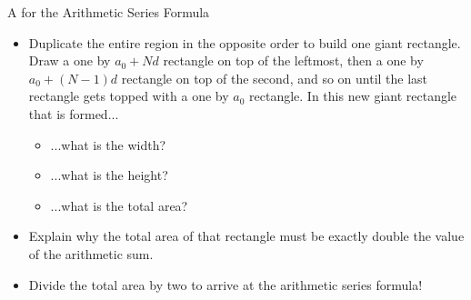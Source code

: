 \begin{exercise}{A  for the Arithmetic Series Formula \Coffeecup \Coffeecup \Coffeecup}
\begin{itemize}
\item Duplicate the entire region in the opposite order to build one giant rectangle.  Draw a one by $a_0 +Nd$ rectangle on top of the leftmost, then a one by $a_0+(N-1)d$ rectangle on top of the second, and so on until the last rectangle gets topped with a one by $a_0$ rectangle.  In this new giant rectangle that is formed...

\begin{itemize}
\item  ...what is the width?
\item ...what is the height?
\item ...what is the total area?
\end{itemize}

\item Explain why the total area of that rectangle must be exactly double the value of the arithmetic sum.  
\item Divide the total area by two to arrive at the arithmetic series formula!
\end{itemize}
\end{exercise}

